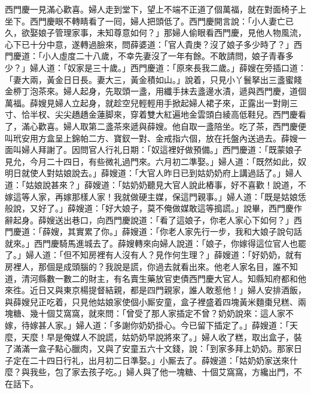 西門慶一見滿心歡喜。婦人走到堂下，望上不端不正道了個萬福，就在對面椅子上坐下。西門慶眼不轉睛看了一囘，婦人把頭低了。西門慶開言說：「小人妻亡已久，欲娶娘子管理家事，未知尊意如何？」那婦人偷眼看西門慶，見他人物風流，心下已十分中意，遂轉過臉來，問薛婆道：「官人貴庚？沒了娘子多少時了？」西門慶道：「小人虛度二十八歲，不幸先妻沒了一年有餘。不敢請問，娘子青春多少？」婦人道：「奴家是三十歲。」西門慶道：「原來長我二歲。」薛嫂在旁插口道：「妻大兩，黃金日日長。妻大三，黃金積如山。」{}說着，只見小丫鬟拏出三盞蜜餞金桺丁泡茶來。婦人起身，先取頭一盞，用纖手抹去盞邊水漬，{}遞與西門慶，道個萬福。薛嫂見婦人立起身，就趁空兒{}輕輕用手掀起婦人裙子來，正露出一對剛三寸、恰半杈、尖尖趫趫金蓮脚來，{}穿着雙大紅遍地金雲頭白綾高低鞋兒。{}西門慶看了，滿心歡喜。婦人取第二盞茶來遞與薛嫂。他自取一盞陪坐。吃了茶，西門慶便叫玳安用方盒呈上錦帕二方、寶釵一對、金戒指六個，放在托盤內送過去。薛嫂一面叫婦人拜謝了。因問官人行礼日期：「奴這裡好做預備。」西門慶道：「既蒙娘子見允，今月二十四日，有些微礼過門來。六月初二準娶。」婦人道：「既然如此，奴明日就使人對姑娘說去。」薛嫂道：「大官人昨日已到姑奶奶府上講過話了。」婦人道：「姑娘說甚來？」薛嫂道：「姑奶奶聽見大官人說此樁事，好不喜歡！說道，不嫁這等人家，再嫁那樣人家！我就做硬主媒，保這門親事。」婦人道：「既是姑娘恁般說，又好了。」{}薛嫂道：「好大娘子，莫不俺做媒敢這等搗謊。」說畢，西門慶作辭起身。薛嫂送出巷口，向西門慶說道：「看了這娘子，你老人家心下如何？」西門慶道：「薛嫂，其實累了你。」{}薛嫂道：「你老人家先行一步，我和大娘子說句話就來。」西門慶騎馬進城去了。薛嫂轉來向婦人說道：「娘子，你嫁得這位官人也罷了。」婦人道：「但不知房裡有人沒有人？{}見作何生理？」薛嫂道：「好奶奶，就有房裡人，那個是成頭腦的？我說是謊，你過去就看出來。{}他老人家名目，誰不知道，清河縣數一數二的財主，有名賣生藥放官吏債西門慶大官人。知縣知府都和他來徃。近日又與東京楊提督結親，都是四門親家，誰人敢惹他！」婦人安排酒飯，與薛嫂兒正吃着，只見他姑娘家使個小厮安童，盒子裡盛着四塊黃米麵棗兒糕、兩塊糖、幾十個艾窩窩，就來問：「曾受了那人家插定不曾？奶奶說來：這人家不嫁，待嫁甚人家。」婦人道：「多謝你奶奶掛心。今已留下插定了。」薛嫂道：「天麼，天麼！早是俺媒人不說謊，姑奶奶早說將來了。」{}婦人收了糕，取出盒子，裝了滿滿一盒子點心臘肉，又與了安童五六十文錢，說：「到家多拜上奶奶。那家日子定在二十四日行礼，出月初二日準娶。」小厮去了。薛嫂道：「姑奶奶家送來什麼？與我些，包了家去孩子吃。」婦人與了他一塊糖、十個艾窩窩，方纔出門，不在話下。

